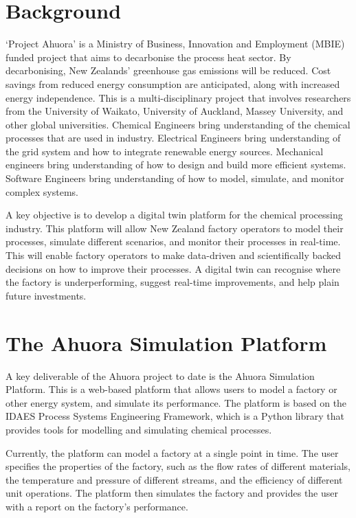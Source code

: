 \documentclass[12pt]{report}
\begin{document}
\section{Background}

`Project Ahuora' is a Ministry of Business, Innovation and Employment (MBIE) funded project that aims to decarbonise the process heat sector.
By decarbonising, New Zealands' greenhouse gas emissions will be reduced. Cost savings from reduced energy consumption are anticipated, along with increased energy independence.
This is a multi-disciplinary project that involves researchers from the University of Waikato, University of Auckland, Massey University,
and other global universities. Chemical Engineers bring understanding of the chemical processes that are used in industry. Electrical Engineers bring understanding of the grid system
and how to integrate renewable energy sources. Mechanical engineers bring understanding of how to design and build more efficient systems. Software Engineers bring understanding of how to
model, simulate, and monitor complex systems.

A key objective is to develop a digital twin platform for the chemical processing industry. This platform will allow New Zealand factory operators to model their processes, simulate different scenarios, and monitor their processes in real-time.
This will enable factory operators to make data-driven and scientifically backed decisions on how to improve their processes. A digital twin can recognise where the factory is underperforming, suggest real-time improvements, and help plain future investments.

\section{The Ahuora Simulation Platform}

A key deliverable of the Ahuora project to date is the Ahuora Simulation Platform. This is a web-based platform that allows users to model a factory or other energy system, and simulate its performance. The platform is based on the IDAES Process Systems Engineering Framework, which is a Python library that provides tools for modelling and simulating chemical processes.

Currently, the platform can model a factory at a single point in time. The user specifies the properties of the factory, such as the flow rates of different materials, the temperature and pressure of different streams, and the efficiency of different unit operations. The platform then simulates the factory and provides the user with a report on the factory's performance.
\end{document}
